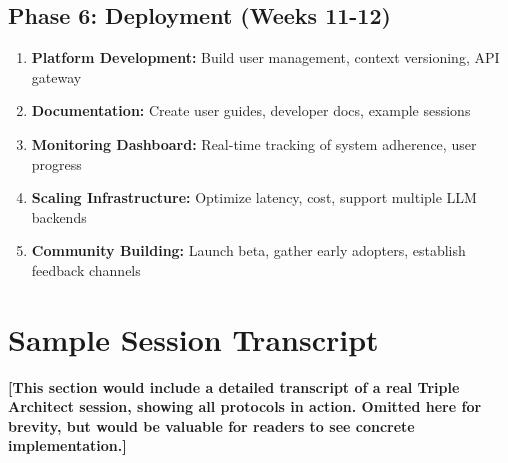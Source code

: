\documentclass[11pt,a4paper]{article}
\theoremstyle{definition}
\theoremstyle{remark}
\begin{document}
\subsection{Phase 6: Deployment (Weeks 11-12)}

\begin{enumerate}
    \item \textbf{Platform Development:} Build user management, context versioning, API gateway
    \item \textbf{Documentation:} Create user guides, developer docs, example sessions
    \item \textbf{Monitoring Dashboard:} Real-time tracking of system adherence, user progress
    \item \textbf{Scaling Infrastructure:} Optimize latency, cost, support multiple LLM backends
    \item \textbf{Community Building:} Launch beta, gather early adopters, establish feedback channels
\end{enumerate}

\section{Sample Session Transcript}

\textbf{[This section would include a detailed transcript of a real Triple Architect session, showing all protocols in action. Omitted here for brevity, but would be valuable for readers to see concrete implementation.]}

\end{document}
